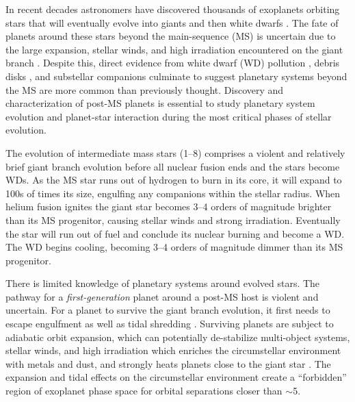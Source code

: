 \documentclass[twocolumn]{aastex631}
\begin{document}
In recent decades astronomers have discovered thousands of exoplanets orbiting stars that will eventually evolve into giants and then white dwarfs \citep{akesonNASAExoplanetArchive2013}. The fate of planets around these stars beyond the main-sequence (MS) is uncertain due to the large expansion, stellar winds, and high irradiation encountered on the giant branch \citep{verasPostmainsequencePlanetarySystem2016}. Despite this, direct evidence from white dwarf (WD) pollution \citep{juraExternallyPollutedWhite2007,xuSpitzerObservationsWhite2012}, debris disks \citep{deruyterKeplerianDiscsPostAGB2006,zuckermanAncientPlanetarySystems2010,koesterFrequencyPlanetaryDebris2014}, and substellar companions \citep[e.g.,][]{luhmanDiscoveryCandidateCoolest2011,vanderburgGiantPlanetCandidate2020,blackmanJovianAnalogueOrbiting2021} culminate to suggest planetary systems beyond the MS are more common than previously thought. Discovery and characterization of post-MS planets is essential to study planetary system evolution and planet-star interaction during the most critical phases of stellar evolution.

The evolution of intermediate mass stars (\qtyrange{1}{8}{\solarmass}) comprises a violent and relatively brief giant branch evolution before all nuclear fusion ends and the stars become WDs. As the MS star runs out of hydrogen to burn in its core, it will expand to 100s of times its size, engulfing any companions within the stellar radius. When helium fusion ignites the giant star becomes \numrange{3}{4} orders of magnitude brighter than its MS progenitor, causing stellar winds and strong irradiation. Eventually the star will run out of fuel and conclude its nuclear burning and become a WD. The WD begins cooling, becoming \numrange{3}{4} orders of magnitude dimmer than its MS progenitor.

There is limited knowledge of planetary systems around evolved stars. The pathway for a \textit{first-generation} planet around a post-MS host is violent and uncertain. For a planet to survive the giant branch evolution, it first needs to escape engulfment as well as tidal shredding \citep{burleighImagingPlanetsNearby2002a,nordhausOrbitsLowmassCompanions2013}. Surviving planets are subject to adiabatic orbit expansion, which can potentially de-stabilize multi-object systems, stellar winds, and high irradiation which enriches the circumstellar environment with metals and dust, and strongly heats planets close to the giant star \citep{mustillForetellingsRagnarokWorldengulfing2012,verasPostmainsequencePlanetarySystem2016}. The expansion and tidal effects on the circumstellar environment create a ``forbidden'' region of exoplanet phase space for orbital separations closer than $\sim$\qty{5}{\au}.
\end{document}

